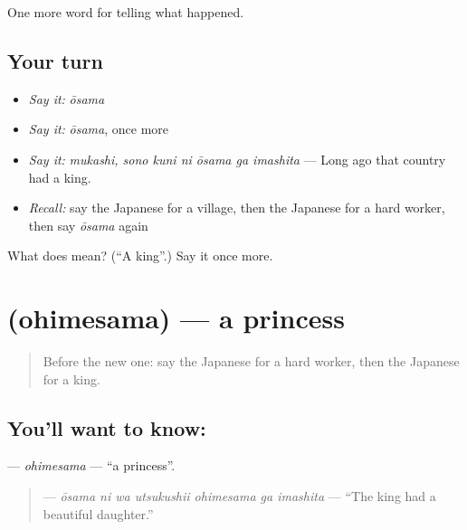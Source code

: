 \begin{grammarlens}[title={What you've built}]
One more word for telling what happened.
\end{grammarlens}

\subsection*{Your turn}
\begin{itemize}
\raggedright
  \item \emph{Say it:} \emph{ōsama}
  \item \emph{Say it:} \emph{ōsama}, once more
  \item \emph{Say it:} \emph{mukashi, sono kuni ni ōsama ga imashita} — Long ago that country had a king.
  \item \emph{Recall:} say the Japanese for a village, then the Japanese for a hard worker, then say \emph{ōsama} again
\end{itemize}

\begin{tcolorbox}[breakable,colback=teal!4,colframe=teal!35!black,title={Before you move on}]
What does  mean? (\textquotedblleft{}A king\textquotedblright{}.) Say it once more.
\end{tcolorbox}
\section[\texorpdfstring{\ja{おひめさま} (ohimesama)}{おひめさま (ohimesama)}]{ (ohimesama) — a princess}

\label{lesson:JA-C299-ohimesama}



\begin{quote}
Before the new one: say the Japanese for a hard worker, then the Japanese for a king.
\end{quote}

\subsection*{You'll want to know: }
\textbf{} — \emph{ohimesama} — \textquotedblleft{}a princess\textquotedblright{}.

\begin{quote}
\textbf{   } — \emph{ōsama ni wa utsukushii ohimesama ga imashita} — \textquotedblleft{}The king had a beautiful daughter.\textquotedblright{}
\end{quote}

